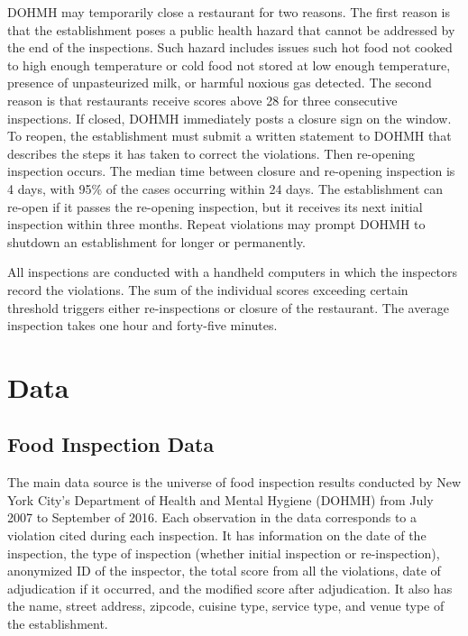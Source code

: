 \documentclass[11pt]{article}
\begin{document}
DOHMH may temporarily close a restaurant for two reasons. The first reason is that the establishment poses a public health hazard that cannot be addressed by the end of the inspections. Such hazard includes issues such hot food not cooked to high enough temperature or cold food not stored at low enough temperature, presence of unpasteurized milk, or harmful noxious gas detected. The second reason is that restaurants receive scores above 28 for three consecutive inspections. If closed, DOHMH immediately posts a closure sign on the window. To reopen, the establishment must submit a written statement to DOHMH that describes the steps it has taken to correct the violations. Then re-opening inspection occurs. The median time between closure and re-opening inspection is 4 days, with 95\% of the cases occurring within 24 days. The establishment can re-open if it passes the re-opening inspection, but it receives its next initial inspection within three months. Repeat violations may prompt DOHMH to shutdown an establishment for longer or permanently. 

All inspections are conducted with a handheld computers in which the inspectors record the violations. The sum of the individual scores exceeding certain threshold triggers either re-inspections or closure of the restaurant. The average inspection takes one hour and forty-five minutes.  

\section{Data}
\label{data}
\subsection{Food Inspection Data}

The main data source is the universe of food inspection results conducted by New York City's Department of Health and Mental Hygiene (DOHMH) from July 2007 to September of 2016. Each observation in the data corresponds to a violation cited during each inspection. It has information on the date of the inspection, the type of inspection (whether initial inspection or re-inspection), anonymized ID of the inspector, the total score from all the violations, date of adjudication if it occurred, and the modified score after adjudication. It also has the name, street address, zipcode, cuisine type, service type, and venue type of the establishment. 
\end{document}
